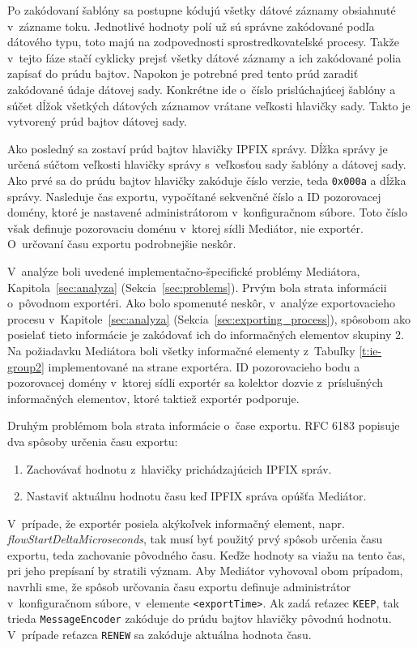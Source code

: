 Po zakódovaní šablóny sa postupne kódujú všetky dátové záznamy obsiahnuté v~zázname toku. Jednotlivé 
hodnoty polí už sú správne zakódované podľa dátového typu, toto majú na zodpovednosti sprostredkovateľské
procesy. Takže v~tejto fáze stačí cyklicky prejsť všetky dátové záznamy a ich zakódované polia zapísať 
do prúdu bajtov. Napokon je potrebné pred tento prúd zaradiť zakódované údaje dátovej sady. Konkrétne
ide o~číslo prislúchajúcej šablóny a súčet dĺžok všetkých dátových záznamov vrátane veľkosti hlavičky sady.
Takto je vytvorený prúd bajtov dátovej sady.

Ako posledný sa zostaví prúd bajtov hlavičky IPFIX správy. Dĺžka správy je určená súčtom veľkosti hlavičky
správy s~veľkosťou sady šablóny a dátovej sady. Ako prvé sa do prúdu bajtov hlavičky zakóduje číslo 
verzie, teda \verb|0x000a| a dĺžka správy. Nasleduje čas exportu, vypočítané sekvenčné číslo a ID 
pozorovacej domény, ktoré je nastavené administrátorom v~konfiguračnom súbore. Toto číslo však definuje
pozorovaciu doménu v~ktorej sídli Mediátor, nie exportér. O~určovaní času exportu podrobnejšie neskôr.

V~analýze boli uvedené implementačno-špecifické problémy Mediátora, Kapitola~\ref{sec:analyza} 
(Sekcia~\ref{sec:problems}). Prvým bola strata informácii o~pôvodnom exportéri. Ako bolo spomenuté neskôr, 
v~analýze exportovacieho procesu v~Kapitole~\ref{sec:analyza} (Sekcia~\ref{sec:exporting_process}),
spôsobom ako posielať tieto informácie je zakódovať ich do informačných elementov skupiny 2. Na požiadavku
Mediátora boli všetky informačné elementy z~Tabuľky \ref{t:ie-group2} implementované na strane exportéra.
ID pozorovacieho bodu a pozorovacej domény v~ktorej sídli exportér sa kolektor dozvie z~príslušných 
informačných elementov, ktoré taktiež exportér podporuje. 

Druhým problémom bola strata informácie o~čase exportu. RFC 6183 \citep{rfc6183} popisuje dva spôsoby 
určenia času exportu:
\begin{enumerate}
 \item Zachovávať hodnotu z~hlavičky prichádzajúcich IPFIX správ.
 \item Nastaviť aktuálnu hodnotu času keď IPFIX správa opúšťa Mediátor.
\end{enumerate}
V~prípade, že exportér posiela akýkoľvek  informačný element, napr. \emph{flowStartDeltaMicroseconds},
tak musí byť použitý prvý spôsob určenia času exportu, teda zachovanie pôvodného času. Keďže 
 hodnoty sa viažu na tento čas, pri jeho prepísaní by stratili význam. Aby Mediátor 
vyhovoval obom prípadom, navrhli sme, že spôsob určovania času exportu definuje administrátor
v~konfiguračnom súbore, v~elemente \verb|<exportTime>|. 
Ak zadá reťazec \verb|KEEP|, tak trieda \verb|MessageEncoder| zakóduje do prúdu bajtov hlavičky pôvodnú
hodnotu. V~prípade reťazca \verb|RENEW| sa zakóduje aktuálna hodnota času.

